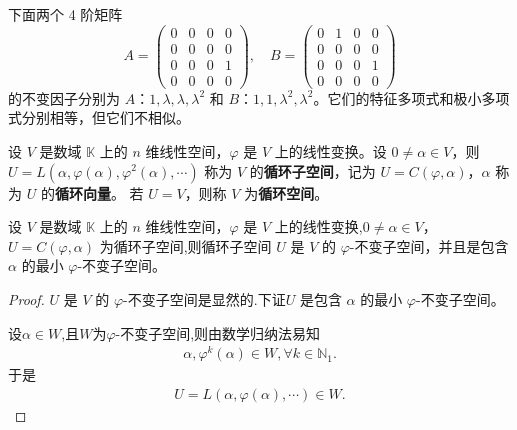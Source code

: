 \documentclass[../../main.tex]{subfiles}%
\begin{document}
\begin{example}
下面两个 4 阶矩阵
\[
A = \begin{pmatrix}
0 & 0 & 0 & 0 \\
0 & 0 & 0 & 0 \\
0 & 0 & 0 & 1 \\
0 & 0 & 0 & 0
\end{pmatrix}, \quad
B = \begin{pmatrix}
0 & 1 & 0 & 0 \\
0 & 0 & 0 & 0 \\
0 & 0 & 0 & 1 \\
0 & 0 & 0 & 0
\end{pmatrix}
\]
的不变因子分别为 $A$：$1,\lambda,\lambda,\lambda^2$ 和 $B$：$1,1,\lambda^2,\lambda^2$。它们的特征多项式和极小多项式分别相等，但它们不相似。 
\end{example}

\begin{definition}[循环子空间]\label{definition:循环子空间和循环空间}
设 \(V\) 是数域 \(\mathbb{K}\) 上的 \(n\) 维线性空间，\(\varphi\) 是 \(V\) 上的线性变换。设 \(0\neq\alpha\in V\)，则 \(U = L(\alpha,\varphi(\alpha),\varphi^2(\alpha),\cdots)\) 称为 \(V\) 的\textbf{循环子空间}，记为 \(U = C(\varphi,\alpha)\)，\(\alpha\) 称为 \(U\) 的\textbf{循环向量}。
若 \(U = V\)，则称 \(V\) 为\textbf{循环空间}。 
\end{definition}

\begin{theorem}[循环子空间的基本性质]\label{theorem:循环子空间的基本性质}
设 \(V\) 是数域 \(\mathbb{K}\) 上的 \(n\) 维线性空间，\(\varphi\) 是 \(V\) 上的线性变换,\(0\neq\alpha\in V\)， \(U = C(\varphi,\alpha)\) 为循环子空间,则循环子空间 \(U\) 是 \(V\) 的 \(\varphi\)-不变子空间，并且是包含 \(\alpha\) 的最小 \(\varphi\)-不变子空间。
\end{theorem}
\begin{proof}
\(U\) 是 \(V\) 的 \(\varphi\)-不变子空间是显然的.下证\(U\) 是包含 \(\alpha\) 的最小 \(\varphi\)-不变子空间。

设$\alpha \in W$,且$W$为$\varphi$-不变子空间,则由数学归纳法易知
\begin{align*}
\alpha,\varphi^k(\alpha)\in W,\forall k\in \mathbb{N}_1.
\end{align*}
于是
\begin{align*}
U=L(\alpha,\varphi(\alpha),\cdots)\in W.
\end{align*}
\end{proof}
\end{document}

